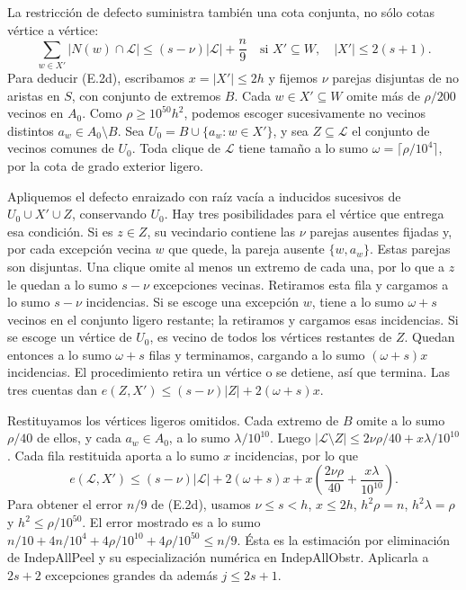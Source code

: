 \documentclass[spanish,11pt,a4paper]{article}
\begin{document}
La restricción de defecto suministra también una cota conjunta, no sólo cotas vértice a vértice: \[
\sum_{w\in X'}|N(w)\cap\mathcal L|
\le (s-\nu)|\mathcal L|+\frac n9
\quad\text{si }X'\subseteq W,\quad |X'|\le2(s+1).
\tag{E.2d}
\] Para deducir (E.2d), escribamos \(x=|X'|\le2h\) y fijemos \(\nu\) parejas disjuntas de no aristas en \(S\), con conjunto de extremos \(B\). Cada \(w\in X'\subseteq W\) omite más de \(\rho/200\) vecinos en \(A_0\). Como \(\rho\ge10^{50}h^2\), podemos escoger sucesivamente no vecinos distintos \(a_w\in A_0\setminus B\). Sea \(U_0=B\cup\{a_w:w\in X'\}\), y sea \(Z\subseteq\mathcal L\) el conjunto de vecinos comunes de \(U_0\). Toda clique de \(\mathcal L\) tiene tamaño a lo sumo \(\omega=\lceil\rho/10^4\rceil\), por la cota de grado exterior ligero.

Apliquemos el defecto enraizado con raíz vacía a inducidos sucesivos de \(U_0\cup X'\cup Z\), conservando \(U_0\). Hay tres posibilidades para el vértice que entrega esa condición. Si es \(z\in Z\), su vecindario contiene las \(\nu\) parejas ausentes fijadas y, por cada excepción vecina \(w\) que quede, la pareja ausente \(\{w,a_w\}\). Estas parejas son disjuntas. Una clique omite al menos un extremo de cada una, por lo que a \(z\) le quedan a lo sumo \(s-\nu\) excepciones vecinas. Retiramos esta fila y cargamos a lo sumo \(s-\nu\) incidencias. Si se escoge una excepción \(w\), tiene a lo sumo \(\omega+s\) vecinos en el conjunto ligero restante; la retiramos y cargamos esas incidencias. Si se escoge un vértice de \(U_0\), es vecino de todos los vértices restantes de \(Z\). Quedan entonces a lo sumo \(\omega+s\) filas y terminamos, cargando a lo sumo \((\omega+s)x\) incidencias. El procedimiento retira un vértice o se detiene, así que termina. Las tres cuentas dan \(e(Z,X')\le(s-\nu)|Z|+2(\omega+s)x\).

Restituyamos los vértices ligeros omitidos. Cada extremo de \(B\) omite a lo sumo \(\rho/40\) de ellos, y cada \(a_w\in A_0\), a lo sumo \(\lambda/10^{10}\). Luego \(|\mathcal L\setminus Z|\le2\nu\rho/40+x\lambda/10^{10}\). Cada fila restituida aporta a lo sumo \(x\) incidencias, por lo que \[
e(\mathcal L,X')\le(s-\nu)|\mathcal L|
 +2(\omega+s)x+x\left(\frac{2\nu\rho}{40}+\frac{x\lambda}{10^{10}}\right).
\] Para obtener el error \(n/9\) de (E.2d), usamos \(\nu\le s<h\), \(x\le2h\), \(h^2\rho=n\), \(h^2\lambda=\rho\) y \(h^2\le\rho/10^{50}\). El error mostrado es a lo sumo \(n/10+4n/10^4+4\rho/10^{10}+4\rho/10^{50}\le n/9\). Ésta es la estimación por eliminación de {\ttfamily\small IndepAllPeel} y su especialización numérica en {\ttfamily\small IndepAllObst\discretionary{\hbox{\ensuremath{\hookrightarrow}}}{}{}r}. Aplicarla a \(2s+2\) excepciones grandes da además \(j\le2s+1\).
\end{document}
